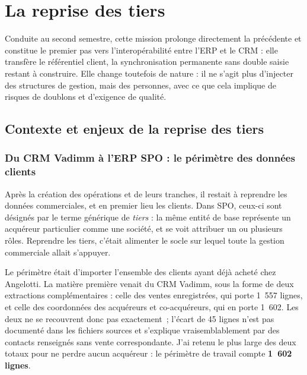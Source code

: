\hypertarget{la-reprise-des-tiers}{%
\section{La reprise des tiers}\label{la-reprise-des-tiers}}

Conduite au second semestre, cette mission prolonge directement la précédente et constitue le
premier pas vers l'interopérabilité entre l'ERP et le CRM : elle transfère le référentiel
client, la synchronisation permanente sans double saisie restant à construire. Elle change
toutefois de nature : il ne s'agit plus d'injecter des structures de gestion, mais des
personnes, avec ce que cela implique de risques de doublons et d'exigence de qualité.

\hypertarget{contexte-et-enjeux-de-la-reprise-des-tiers}{%
\subsection{Contexte et enjeux de la reprise des tiers}\label{contexte-et-enjeux-de-la-reprise-des-tiers}}

\hypertarget{du-crm-vadimm-uxe0-lerp-spo-le-puxe9rimuxe8tre-des-donnuxe9es-clients}{%
\subsubsection{Du CRM Vadimm à l'ERP SPO : le périmètre des données clients}\label{du-crm-vadimm-uxe0-lerp-spo-le-puxe9rimuxe8tre-des-donnuxe9es-clients}}

Après la création des opérations et de leurs tranches, il restait à reprendre les données
commerciales, et en premier lieu les clients. Dans SPO, ceux-ci sont désignés par le terme
générique de \emph{tiers} : la même entité de base représente un acquéreur particulier comme une
société, et se voit attribuer un ou plusieurs rôles. Reprendre les tiers, c'était alimenter le
socle sur lequel toute la gestion commerciale allait s'appuyer.

Le périmètre était d'importer l'ensemble des clients ayant déjà acheté chez Angelotti. La
matière première venait du CRM Vadimm, sous la forme de deux extractions complémentaires :
celle des ventes enregistrées, qui porte 1~557 lignes, et celle des coordonnées des acquéreurs
et co-acquéreurs, qui en porte 1~602. Les deux ne se recouvrent donc pas exactement~; l'écart
de 45 lignes n'est pas documenté dans les fichiers sources et s'explique vraisemblablement par
des contacts renseignés sans vente correspondante. J'ai retenu le plus large des deux totaux
pour ne perdre aucun acquéreur : le périmètre de travail compte \textbf{1~602 lignes}.

